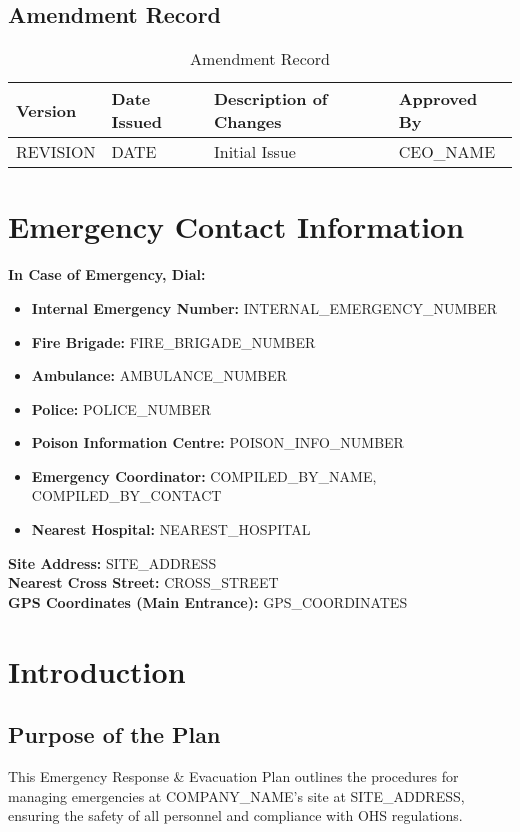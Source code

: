 \documentclass[12pt]{article}
\begin{document}
\subsection{Amendment Record}
\begin{table}[h]
    \centering
    \begin{tabular}{p{2cm}p{3cm}p{6cm}p{3cm}}
        \toprule
        \textbf{Version} & \textbf{Date Issued} & \textbf{Description of Changes} & \textbf{Approved By} \\
        \midrule
        {{REVISION}} & {{DATE}} & Initial Issue & {{CEO_NAME}} \\
        \bottomrule
    \end{tabular}
    \caption{Amendment Record}
\end{table}

\section{Emergency Contact Information}
\textbf{In Case of Emergency, Dial:}
\begin{itemize}
    \item \textbf{Internal Emergency Number:} {{INTERNAL_EMERGENCY_NUMBER}}
    \item \textbf{Fire Brigade:} {{FIRE_BRIGADE_NUMBER}}
    \item \textbf{Ambulance:} {{AMBULANCE_NUMBER}}
    \item \textbf{Police:} {{POLICE_NUMBER}}
    \item \textbf{Poison Information Centre:} {{POISON_INFO_NUMBER}}
    \item \textbf{Emergency Coordinator:} {{COMPILED_BY_NAME}}, {{COMPILED_BY_CONTACT}}
    \item \textbf{Nearest Hospital:} {{NEAREST_HOSPITAL}}
\end{itemize}

\textbf{Site Address:} {{SITE_ADDRESS}}\\
\textbf{Nearest Cross Street:} {{CROSS_STREET}}\\
\textbf{GPS Coordinates (Main Entrance):} {{GPS_COORDINATES}}

\section{Introduction}

\subsection{Purpose of the Plan}
This Emergency Response \& Evacuation Plan outlines the procedures for managing emergencies at {{COMPANY_NAME}}'s site at {{SITE_ADDRESS}}, ensuring the safety of all personnel and compliance with OHS regulations.
\end{document}
